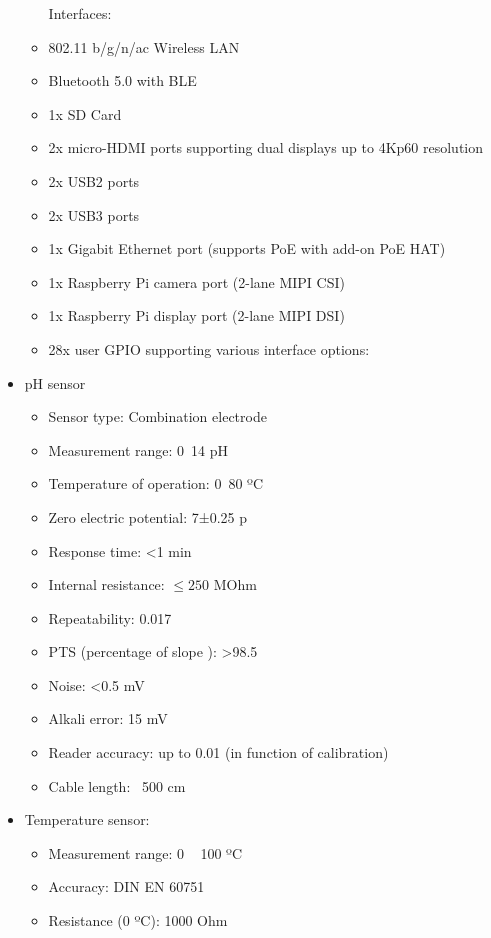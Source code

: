 \begin{itemize}
\begin{itemize}
        Interfaces: 
        \item 802.11 b/g/n/ac Wireless LAN
        \item Bluetooth 5.0 with BLE
        \item 1x SD Card
        \item 2x micro-HDMI ports supporting dual displays up to 4Kp60 resolution
        \item 2x USB2 ports
        \item 2x USB3 ports
        \item 1x Gigabit Ethernet port (supports PoE with add-on PoE HAT)
        \item 1x Raspberry Pi camera port (2-lane MIPI CSI)
        \item 1x Raspberry Pi display port (2-lane MIPI DSI)
        \item 28x user GPIO supporting various interface options:
    \end{itemize}
    \item pH sensor \\
    \begin{itemize}
        \item Sensor type: Combination electrode
        \item Measurement range: 0~14 pH
        \item Temperature of operation: 0~80 ºC
        \item Zero electric potential: 7±0.25 p
        \item Response time: <1 min
        \item Internal resistance: $\leq 250$ MOhm
        \item Repeatability: 0.017
        \item PTS (percentage of slope ): >98.5
        \item Noise: <0.5 mV
        \item Alkali error: 15 mV
        \item Reader accuracy: up to 0.01 (in function of calibration)
        \item Cable length: ~500 cm
    \end{itemize}
    \item Temperature sensor: \\
    \begin{itemize}
        \item Measurement range: 0 ~ 100 ºC
        \item Accuracy: DIN EN 60751
        \item Resistance (0 ºC): 1000 Ohm

\end{itemize}
\end{itemize}
